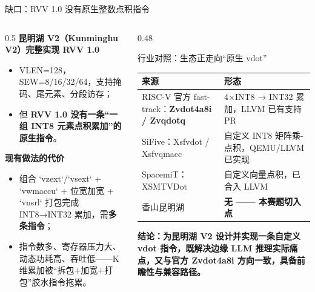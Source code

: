 \documentclass[aspectratio=169]{beamer}
\newcommand{\smalltable}[1]{\par\centering\scriptsize #1\par}
\begin{document}
\begin{frame}{缺口：RVV 1.0 没有原生整数点积指令}
\begin{columns}[T]
\begin{column}{0.5\textwidth}
\textbf{昆明湖 V2（Kunminghu V2）完整实现 RVV 1.0}
\begin{itemize}
  \item VLEN=128，SEW=8/16/32/64，支持掩码、尾元素、分段访存；
  \item 但 \textbf{RVV 1.0 没有一条“一组 INT8 元素点积累加”的原生指令}。
\end{itemize}
\textbf{现有做法的代价}
\begin{itemize}
  \item 组合 `vzext`/`vsext` + `vwmaccu` + 位宽加宽 + `vnsrl` 打包完成 INT8→INT32 累加，需\textbf{多条指令}；
  \item 指令数多、寄存器压力大、动态功耗高、吞吐低——K 维累加被“拆包+加宽+打包”胶水指令拖累。
\end{itemize}
\end{column}
\begin{column}{0.48\textwidth}
\begin{block}{行业对照：生态正走向“原生 vdot”}
\smalltable{%
\begin{tabular}{@{}p{3.0cm}p{3.1cm}@{}}
\toprule
来源 & 形态 \\
\midrule
RISC-V 官方 fast-track：\textbf{Zvdot4a8i / Zvqdotq} & 4×INT8 → INT32 累加，LLVM 已有支持 PR \\
SiFive：Xsfvdot / Xsfvqmacc & 自定义 INT8 矩阵乘-点积，QEMU/LLVM 已实现 \\
SpacemiT：XSMTVDot & 自定义向量点积，已合入 LLVM \\
香山昆明湖 & \textbf{无 —— 本赛题切入点} \\
\bottomrule
\end{tabular}}
\end{block}
\textbf{结论：为昆明湖 V2 设计并实现一条自定义 vdot 指令，既解决边缘 LLM 推理实际痛点，又与官方 Zvdot4a8i 方向一致，具备前瞻性与兼容路径。}
\end{column}
\end{columns}
\end{frame}
\end{document}
